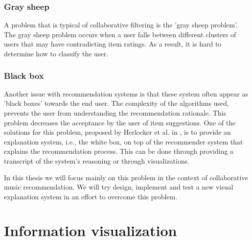 \subsubsection{Gray sheep}

A problem that is typical of collaborative filtering is the 'gray sheep problem'\cite{burke:2002, herlocker:2000}. The gray sheep problem occurs when a user falls between different clusters of users that may have contradicting item ratings. As a result, it is hard to determine how to classify the user\cite{burke:2002}.


\subsubsection{Black box}

Another issue with recommendation systems is that these system often appear as 'black boxes' towards the end user. The complexity of the algorithms used, prevents the user from understanding the recommendation rationale\cite{zhao:2010}. This problem decreases the acceptance by the user of item suggestions. One of the solutions for this problem, proposed by Herlocker et al. in \cite{herlocker:2000}, is to provide an explanation system, i.e., the white box, on top of the recommender system that explains the recommendation process. This can be done through providing a transcript of the system's reasoning or through visualizations\cite{herlocker:2000}.

In this thesis we will focus mainly on this problem in the context of collaborative music recommendation. We will try design, implement and test a new visual explanation system in an effort to overcome this problem.
















% 
\section{Information visualization}\label{chapter:literature_study:section:interaction}



